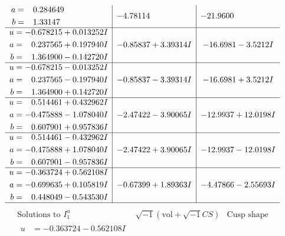 \documentclass[1p]{elsarticle_modified}
\theoremstyle{definition}
\newcommand{\I}{\sqrt{-1}}
\begin{document}
$$\begin{array}{c|c|c}
\begin{aligned}
a &= \phantom{-}0.284649\phantom{ +0.000000I} \\
b &= \phantom{-}1.33147\phantom{ +0.000000I}\end{aligned}
 & -4.78114\phantom{ +0.000000I} & -21.9600\phantom{ +0.000000I} \\ \hline\begin{aligned}
u &= -0.678215 + 0.013252 I \\
a &= \phantom{-}0.237565 + 0.197940 I \\
b &= \phantom{-}1.364900 - 0.142720 I\end{aligned}
 & -0.85837 + 3.39314 I & -16.6981 - 3.5212 I \\ \hline\begin{aligned}
u &= -0.678215 - 0.013252 I \\
a &= \phantom{-}0.237565 - 0.197940 I \\
b &= \phantom{-}1.364900 + 0.142720 I\end{aligned}
 & -0.85837 - 3.39314 I & -16.6981 + 3.5212 I \\ \hline\begin{aligned}
u &= \phantom{-}0.514461 + 0.432962 I \\
a &= -0.475888 - 1.078040 I \\
b &= \phantom{-}0.607901 + 0.957836 I\end{aligned}
 & -2.47422 - 3.90065 I & -12.9937 + 12.0198 I \\ \hline\begin{aligned}
u &= \phantom{-}0.514461 - 0.432962 I \\
a &= -0.475888 + 1.078040 I \\
b &= \phantom{-}0.607901 - 0.957836 I\end{aligned}
 & -2.47422 + 3.90065 I & -12.9937 - 12.0198 I \\ \hline\begin{aligned}
u &= -0.363724 + 0.562108 I \\
a &= -0.699635 + 0.105819 I \\
b &= \phantom{-}0.448049 - 0.543530 I\end{aligned}
 & -0.67399 + 1.89363 I & -4.47866 - 2.55693 I\\
 \hline 
 \end{array}$$\newpage$$\begin{array}{c|c|c}  
\text{Solutions to }I^u_{1}& \I (\text{vol} + \sqrt{-1}CS) & \text{Cusp shape}\\
 \hline 
\begin{aligned}
u &= -0.363724 - 0.562108 I \\

\end{aligned}
\end{array}$$
\end{document}
